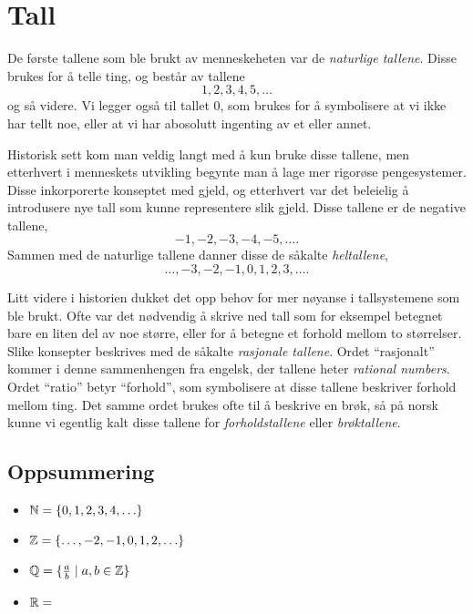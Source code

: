 

\section{Tall}

De første tallene som ble brukt av menneskeheten var de \emph{naturlige tallene}. 
Disse brukes for å telle ting, og består av tallene 
$$1, 2, 3, 4, 5, \ldots$$
og så videre.
Vi legger også til tallet $0$, som brukes for å symbolisere at vi ikke har tellt noe, eller at vi har abosolutt ingenting av et eller annet. 

Historisk sett kom man veldig langt med å kun bruke disse tallene, men etterhvert i menneskets utvikling begynte man å lage mer rigorøse pengesystemer. 
Disse inkorporerte konseptet med gjeld, og etterhvert var det beleielig å introdusere nye tall som kunne representere slik gjeld. 
Disse tallene er de negative tallene, 
$$-1, -2, -3, -4, -5, \ldots.$$
Sammen med de naturlige tallene danner disse de såkalte \emph{heltallene}, 
$$\ldots, -3, -2, -1, 0, 1, 2, 3, \ldots . $$

Litt videre i historien dukket det opp behov for mer nøyanse i tallsystemene som ble brukt. 
Ofte var det nødvendig å skrive ned tall som for eksempel betegnet bare en liten del av noe større, eller for å betegne et forhold mellom to størrelser. 
Slike konsepter beskrives med de såkalte \emph{rasjonale tallene}. 
Ordet ``rasjonalt'' kommer i denne sammenhengen fra engelsk, der tallene heter \emph{rational numbers}. 
Ordet ``ratio'' betyr ``forhold'', som symbolisere at disse tallene beskriver forhold mellom ting. 
Det samme ordet brukes ofte til å beskrive en brøk, så på norsk kunne vi egentlig kalt disse tallene for \emph{forholdstallene} eller \emph{brøktallene}.





\subsection{Oppsummering}
\begin{itemize}
    \item $\mathbb{N} = \{0,1,2,3,4,\ldots \}$
    \item $\mathbb{Z} = \{\ldots, -2, -1, 0, 1, 2, \ldots\}$ 
    \item $\mathbb{Q} = \{\frac{a}{b} \mid a, b \in \mathbb{Z}\}$
    \item $\mathbb{R} = $
\end{itemize}
